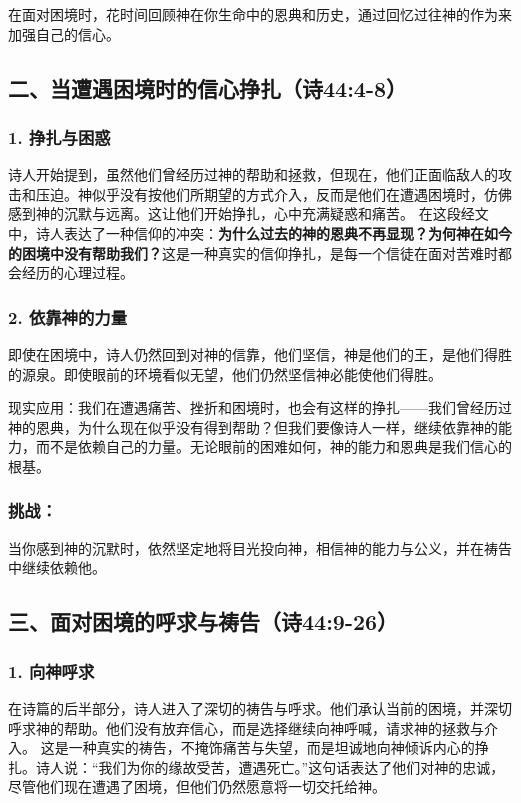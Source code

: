 \documentclass[a4paper, 12pt]{article}
\begin{document}
在面对困境时，花时间回顾神在你生命中的恩典和历史，通过回忆过往神的作为来加强自己的信心。
\subsection*{二、当遭遇困境时的信心挣扎（诗44:4-8）}

\subsubsection*{1. 挣扎与困惑}
\hspace{0.6cm}诗人开始提到，虽然他们曾经历过神的帮助和拯救，但现在，他们正面临敌人的攻击和压迫。神似乎没有按他们所期望的方式介入，反而是他们在遭遇困境时，仿佛感到神的沉默与远离。这让他们开始挣扎，心中充满疑惑和痛苦。
在这段经文中，诗人表达了一种信仰的冲突：\textbf{为什么过去的神的恩典不再显现？为何神在如今的困境中没有帮助我们？}这是一种真实的信仰挣扎，是每一个信徒在面对苦难时都会经历的心理过程。
\subsubsection*{2. 依靠神的力量}
\hspace{0.6cm}即使在困境中，诗人仍然回到对神的信靠，他们坚信，神是他们的王，是他们得胜的源泉。即使眼前的环境看似无望，他们仍然坚信神必能使他们得胜。

现实应用：我们在遭遇痛苦、挫折和困境时，也会有这样的挣扎——我们曾经历过神的恩典，为什么现在似乎没有得到帮助？但我们要像诗人一样，继续依靠神的能力，而不是依赖自己的力量。无论眼前的困难如何，神的能力和恩典是我们信心的根基。
\subsubsection*{挑战：}

当你感到神的沉默时，依然坚定地将目光投向神，相信神的能力与公义，并在祷告中继续依赖他。
\subsection*{三、面对困境的呼求与祷告（诗44:9-26）}

\subsubsection*{1. 向神呼求}
\hspace{0.6cm}在诗篇的后半部分，诗人进入了深切的祷告与呼求。他们承认当前的困境，并深切呼求神的帮助。他们没有放弃信心，而是选择继续向神呼喊，请求神的拯救与介入。
这是一种真实的祷告，不掩饰痛苦与失望，而是坦诚地向神倾诉内心的挣扎。诗人说：“我们为你的缘故受苦，遭遇死亡。”这句话表达了他们对神的忠诚，尽管他们现在遭遇了困境，但他们仍然愿意将一切交托给神。
\end{document}
